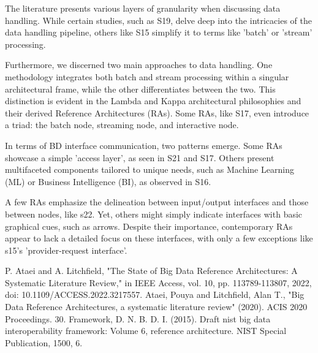 \documentclass[conference]{IEEEtran}
\begin{document}
The literature presents various layers of granularity when discussing data handling. While certain studies, such as S19, delve deep into the intricacies of the data handling pipeline, others like S15 simplify it to terms like 'batch' or 'stream' processing.

Furthermore, we discerned two main approaches to data handling. One methodology integrates both batch and stream processing within a singular architectural frame, while the other differentiates between the two. This distinction is evident in the Lambda and Kappa architectural philosophies and their derived Reference Architectures (RAs). Some RAs, like S17, even introduce a triad: the batch node, streaming node, and interactive node.

In terms of BD interface communication, two patterns emerge. Some RAs showcase a simple 'access layer', as seen in S21 and S17. Others present multifaceted components tailored to unique needs, such as Machine Learning (ML) or Business Intelligence (BI), as observed in S16.

A few RAs emphasize the delineation between input/output interfaces and those between nodes, like s22. Yet, others might simply indicate interfaces with basic graphical cues, such as arrows. Despite their importance, contemporary RAs appear to lack a detailed focus on these interfaces, with only a few exceptions like s15's 'provider-request interface'.


\begin{thebibliography}{00}


 P. Ataei and A. Litchfield, "The State of Big Data Reference Architectures: A Systematic Literature Review," in IEEE Access, vol. 10, pp. 113789-113807, 2022, doi: 10.1109/ACCESS.2022.3217557.
 Ataei, Pouya and Litchfield, Alan T., "Big Data Reference Architectures, a systematic literature review" (2020). ACIS 2020 Proceedings. 30.
 Framework, D. N. B. D. I. (2015). Draft nist big data interoperability framework: Volume 6, reference architecture. NIST Special Publication, 1500, 6.



\end{thebibliography}
\end{document}
